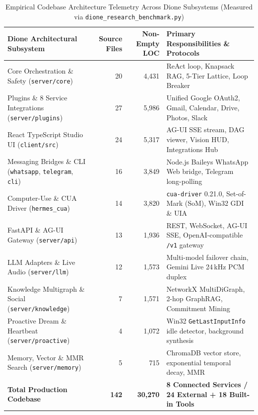 \documentclass[10pt,a4paper]{article}
\begin{document}
\begin{table}[htbp]
\centering
\caption{Empirical Codebase Architecture Telemetry Across Dione Subsystems (Measured via \texttt{dione\_research\_benchmark.py})}
\label{tab:codebase}
\small
\begin{tabularx}{\textwidth}{Xrrl}
\toprule
\textbf{Dione Architectural Subsystem} & \textbf{Source Files} & \textbf{Non-Empty LOC} & \textbf{Primary Responsibilities \& Protocols} \\
\midrule
Core Orchestration \& Safety (\texttt{server/core}) & 20 & 4,431 & ReAct loop, Knapsack RAG, 5-Tier Lattice, Loop Breaker \\
Plugins \& 8 Service Integrations (\texttt{server/plugins}) & 27 & 5,986 & Unified Google OAuth2, Gmail, Calendar, Drive, Photos, Slack \\
React TypeScript Studio UI (\texttt{client/src}) & 24 & 5,317 & AG-UI SSE stream, DAG viewer, Vision HUD, Integrations Hub \\
Messaging Bridges \& CLI (\texttt{whatsapp}, \texttt{telegram}, \texttt{cli}) & 16 & 3,849 & Node.js Baileys WhatsApp Web bridge, Telegram long-polling \\
Computer-Use \& CUA Driver (\texttt{hermes\_cua}) & 14 & 3,820 & \texttt{cua-driver} 0.21.0, Set-of-Mark (SoM), Win32 GDI \& UIA \\
FastAPI \& AG-UI Gateway (\texttt{server/api}) & 13 & 1,936 & REST, WebSocket, AG-UI SSE, OpenAI-compatible \texttt{/v1} gateway \\
LLM Adapters \& Live Audio (\texttt{server/llm}) & 12 & 1,573 & Multi-model failover chain, Gemini Live 24\,kHz PCM duplex \\
Knowledge Multigraph \& Social (\texttt{server/knowledge}) & 7 & 1,571 & NetworkX MultiDiGraph, 2-hop GraphRAG, Commitment Mining \\
Proactive Dream \& Heartbeat (\texttt{server/proactive}) & 4 & 1,072 & Win32 \texttt{GetLastInputInfo} idle detector, background synthesis \\
Memory, Vector \& MMR Search (\texttt{server/memory}) & 5 & 715 & ChromaDB vector store, exponential temporal decay, MMR \\
\midrule
\textbf{Total Production Codebase} & \textbf{142} & \textbf{30,270} & \textbf{8 Connected Services / 24 External + 18 Built-in Tools} \\
\bottomrule
\end{tabularx}
\end{table}
\end{document}
